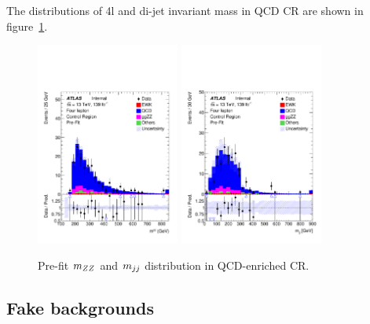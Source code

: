 The distributions of 4l and di-jet invariant mass in QCD CR are shown in figure~\ref{fig:qcdcr_prefit}.
\begin{figure}[!htb]
  \centering
  \includegraphics[width=0.42\textwidth]{figures/VBSZZ/QCDCR/MZZ_4l_QCD_CR.pdf}
  \includegraphics[width=0.42\textwidth]{figures/VBSZZ/QCDCR/MJJ_4l_QCD_CR_fullSyst.pdf}
  \caption{Pre-fit $m_{ZZ}$ and $m_{jj}$ distribution in QCD-enriched CR.}
  \label{fig:qcdcr_prefit}
\end{figure}

\subsection{Fake backgrounds}

